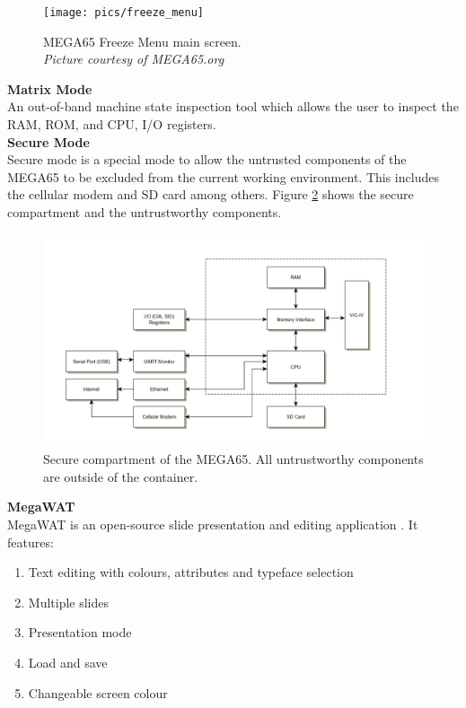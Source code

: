 \begin{figure} \begin{center}
\texttt{[image: pics/freeze\_menu]} 
\end{center} 
\caption{MEGA65 Freeze Menu main screen. \\
\textit{\small{Picture courtesy of MEGA65.org}}}
\label{freeze menu}
\end{figure}

\textbf{Matrix Mode}\\
An out-of-band machine state inspection tool which allows the user to inspect the RAM, ROM, and CPU, I/O registers.\\

\textbf{Secure Mode}\\
Secure mode is a special mode to allow the untrusted components of the MEGA65 to be excluded from the current working environment. This includes the cellular modem and SD card among others. Figure \ref{secure_compartment} shows the secure compartment and the untrustworthy components.\\

\begin{figure} \begin{center}
\includegraphics[width=.5\linewidth]{pics/secure_compartment} 
\end{center} 
\caption{Secure compartment of the MEGA65. All untrustworthy components are outside of the container.}
\label{secure_compartment}
\end{figure}


\textbf{MegaWAT} \\
MegaWAT is an open-source slide presentation and editing application \cite{RN163}. It features:
\begin{enumerate}
\item Text editing with colours, attributes and typeface selection
\item Multiple slides
\item Presentation mode
\item Load and save
\item Changeable screen colour
\end{enumerate}

